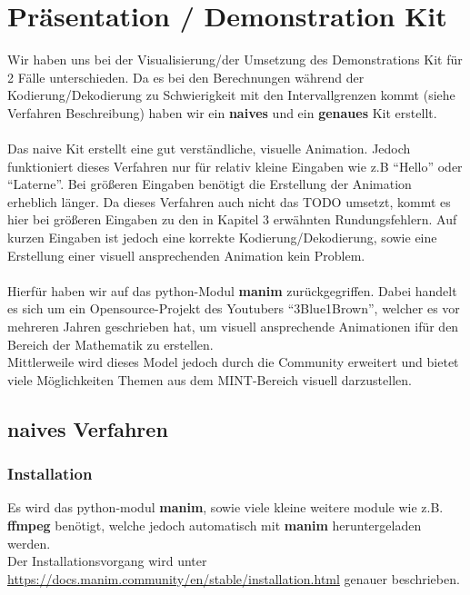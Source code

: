 \documentclass[a4paper]{article}
\theoremstyle{definition}
\theoremstyle{remark}
\begin{document}
			\section{Präsentation / Demonstration Kit}
Wir haben uns bei der Visualisierung/der Umsetzung des Demonstrations Kit für 2 Fälle unterschieden. Da es bei den Berechnungen während der Kodierung/Dekodierung zu Schwierigkeit mit den Intervallgrenzen kommt (siehe Verfahren Beschreibung) haben wir ein \textbf{naives} und ein \textbf{genaues} Kit erstellt.
\\
\\
Das naive Kit erstellt eine gut verständliche, visuelle Animation. Jedoch funktioniert dieses Verfahren nur für relativ kleine Eingaben wie z.B ``Hello'' oder ``Laterne''. Bei größeren Eingaben benötigt die Erstellung der Animation erheblich länger. Da dieses Verfahren auch nicht das TODO umsetzt, kommt es hier bei größeren Eingaben zu den in Kapitel 3 erwähnten Rundungsfehlern. Auf kurzen Eingaben ist jedoch eine korrekte
Kodierung/Dekodierung, sowie eine Erstellung einer visuell ansprechenden Animation kein Problem. 
\\
\\
Hierfür haben wir auf das python-Modul \textbf{manim} zurückgegriffen. Dabei handelt es sich um ein Opensource-Projekt des Youtubers ``3Blue1Brown'', welcher es vor mehreren Jahren geschrieben hat, um visuell ansprechende Animationen ifür den Bereich der Mathematik zu erstellen.
\\
Mittlerweile wird dieses Model jedoch durch die Community erweitert und bietet viele Möglichkeiten Themen aus dem MINT-Bereich visuell darzustellen.
\subsection{naives Verfahren}
\subsubsection{Installation}
Es wird das python-modul \textbf{manim}, sowie viele kleine weitere module wie z.B. \textbf{ffmpeg} benötigt, welche jedoch automatisch mit \textbf{manim} heruntergeladen werden.\\
Der Installationsvorgang wird unter \href{https://docs.manim.community/en/stable/installation.html}{https://docs.manim.community/en/stable/installation.html}
genauer beschrieben.
\\
\end{document}
